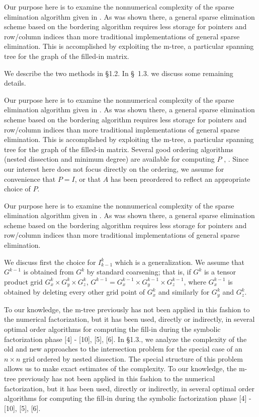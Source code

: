 \documentclass[twoside,leqno,twocolumn]{article}
\begin{document}
Our purpose here is to examine the nonnumerical complexity of the
sparse elimination algorithm given in  \cite{BANKSMITH}.
As was shown there, a general sparse elimination scheme based on the
bordering algorithm requires less storage for pointers and
row/column indices than more traditional implementations of general
sparse elimination.  This is accomplished by exploiting the m-tree,
a particular spanning tree for the graph of the filled-in matrix.

\begin{Definition}{\rm We describe the two methods in \S 1.2. In \S\ 1.3. we
discuss
some remaining details.}
\end{Definition}

Our purpose here is to examine the nonnumerical complexity of the
sparse elimination algorithm given in  \cite{BANKSMITH}.
As was shown there, a general sparse elimination scheme based on the
bordering algorithm requires less storage for pointers and
row/column indices than more traditional implementations of general
sparse elimination.  This is accomplished by exploiting the m-tree,
a particular spanning tree for the graph of the filled-in matrix.
Several good ordering algorithms (nested dissection and minimum degree)
are available for computing $P$  \cite{GEORGELIU}, \cite{ROSE72}.
Since our interest here does not
focus directly on the ordering, we assume for convenience that $P=I$,
or that $A$ has been preordered to reflect an appropriate choice of $P$.

Our purpose here is to examine the nonnumerical complexity of the
sparse elimination algorithm given in  \cite{BANKSMITH}.
As was shown there, a general sparse elimination scheme based on the
bordering algorithm requires less storage for pointers and
row/column indices than more traditional implementations of general
sparse elimination.

\begin{lemma} We discuss first the choice for $I_{k-1}^k$
which is a generalization. We assume that $G^{k-1}$ is
obtained
from $G^k$
by standard coarsening; that is, if $G^k$ is a tensor product
grid $G_{x}^k \times G_{y}^k \times G_{z}^k$,
$G^{k-1}=G_{x}^{k-1} \times G_{y}^{k-1} \times G_{z}^{k-1}$,
where $G_{x}^{k-1}$ is obtained by deleting every other grid
point of $G_x^k$ and similarly for $G_{y}^k$ and $G_{z}^k$.
\end{lemma}

To our knowledge, the m-tree previously has not been applied in this
fashion to the numerical factorization, but it has been used,
directly or indirectly, in several optimal order algorithms for
computing the fill-in during the symbolic factorization phase
[4] - [10], [5], [6]. In \S 1.3., we analyze the complexity of the old and new
approaches to the intersection problem for the special case of
an $n \times n$ grid ordered by nested dissection. The special
structure of this problem allows us to make exact estimates of
the complexity. To our knowledge, the m-tree previously has not been applied in this
fashion to the numerical factorization, but it has been used,
directly or indirectly, in several optimal order algorithms for
computing the fill-in during the symbolic factorization phase
[4] - [10], [5], [6].
\end{document}
